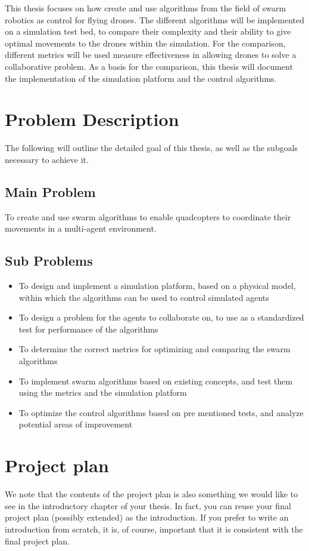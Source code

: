 This thesis focuses on how create and use algorithms from the field of swarm robotics as control for flying drones.
The different algorithms will be implemented on a simulation test bed, to compare their complexity and their ability to give optimal movements to the drones within the simulation. 
For the comparison, different metrics will be used measure effectiveness in allowing drones to solve a collaborative problem.
As a basis for the comparison, this thesis will document the implementation of the simulation platform and the control algorithms.

\section{Problem Description}
The following will outline the detailed goal of this thesis, as well as the subgoals necessary to achieve it. 

\subsection{Main Problem}
To create and use swarm algorithms to enable quadcopters to coordinate their movements in a multi-agent environment. 

\subsection{Sub Problems}
\label{intro:sub_problems}
\begin{itemize}
	\item{To design and implement a simulation platform, based on a physical model, within which the algorithms can be used to control simulated agents}
	\item{To design a problem for the agents to collaborate on, to use as a standardized test for performance of the algorithms}
	\item{To determine the correct metrics for optimizing and comparing the swarm algorithms}
	\item{To implement swarm algorithms based on existing concepts, and test them using the metrics and the simulation platform}
	\item{To optimize the control algorithms based on pre mentioned tests, and analyze potential areas of improvement}
\end{itemize}

 
\section{Project plan}
We note that the contents of the project plan is also something we would like to see in the introductory chapter of your thesis. In fact, you can reuse your final project plan (possibly extended) as the introduction. If you prefer to write an introduction from scratch, it is, of course, important that it is consistent with the final project plan.

